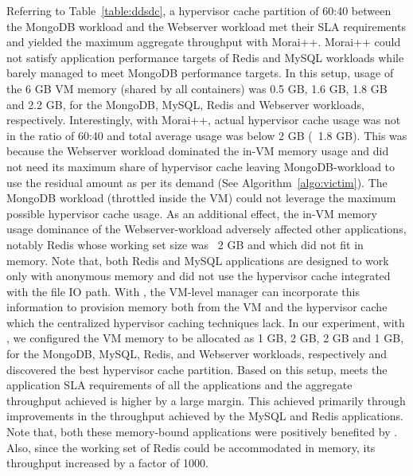 Referring to Table~\ref{table:ddsdc}, a hypervisor cache partition of 60:40 
between the MongoDB workload and the Webserver workload met their SLA requirements
and yielded the maximum aggregate throughput with Morai++.
%
Morai++ could not satisfy application performance targets of Redis and MySQL 
workloads while barely managed to meet MongoDB performance targets. 
%
In this setup, usage of the 6 GB VM memory (shared
by all containers) was 0.5 GB, 1.6 GB, 1.8 GB and 2.2 GB, for the 
MongoDB, MySQL,
Redis and Webserver workloads, respectively.
%
%
Interestingly, with Morai++, actual hypervisor cache usage was not in the ratio of 60:40
and total average usage was below 2 GB (~1.8 GB).
%
%
%
%
%
This was because the Webserver workload dominated the in-VM memory usage 
and did not need its maximum share of hypervisor cache leaving MongoDB-workload
to use the residual amount as per its demand (See Algorithm~\ref{algo:victim}).
%
The MongoDB workload (throttled inside the VM) could not leverage the
maximum possible hypervisor cache usage. 
%
As an additional effect, the in-VM memory usage dominance of the Webserver-workload
adversely affected other applications, notably Redis whose
working set size was ~2 GB and which did not fit in memory.
%
Note that, both Redis and MySQL applications are designed
to work only with anonymous memory and did not use the hypervisor cache
integrated with the file IO path.
%
%
%
With \dd{}, the VM-level manager can incorporate this information to
provision memory both from the VM and the hypervisor cache which
%
the centralized hypervisor caching techniques lack. 
%
In our experiment, with \dd{}, we configured the VM memory to be allocated
as 1 GB, 2 GB, 2 GB and 1 GB, for the MongoDB, MySQL, Redis, and Webserver
workloads, respectively and discovered the best hypervisor cache
partition.
%
Based on this setup, \dd{} meets the application SLA requirements
of all the applications and the aggregate throughput achieved is higher
by a large margin.
%
This achieved primarily through improvements in the throughput achieved
by the MySQL and Redis applications.
%
Note that, both these memory-bound applications were positively 
benefited by \dd{}.
%
Also, since the working set of Redis could be accommodated in memory,
its throughput increased by a factor of 1000.


